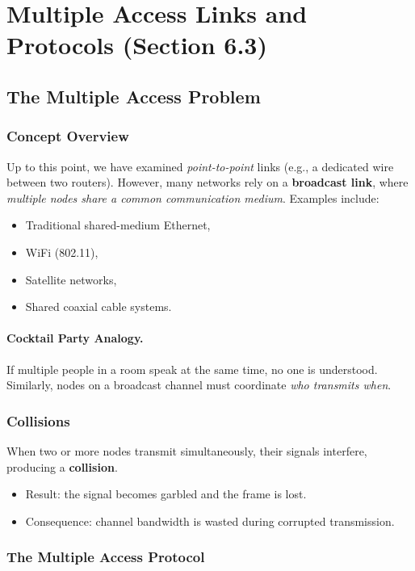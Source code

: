 \documentclass[12pt]{article}
\begin{document}
\section{Multiple Access Links and Protocols (Section 6.3)}

\subsection{The Multiple Access Problem}

\subsubsection{Concept Overview}

Up to this point, we have examined \emph{point-to-point} links (e.g., a dedicated wire between two routers).
However, many networks rely on a \textbf{broadcast link}, where \emph{multiple nodes share a common communication medium}. Examples include:
\begin{itemize}
    \item Traditional shared-medium Ethernet,
    \item WiFi (802.11),
    \item Satellite networks,
    \item Shared coaxial cable systems.
\end{itemize}

\paragraph{Cocktail Party Analogy.}
If multiple people in a room speak at the same time, no one is understood. Similarly, nodes on a broadcast channel must coordinate \emph{who transmits when}.

\subsubsection{Collisions}

When two or more nodes transmit simultaneously, their signals interfere, producing a \textbf{collision}.
\begin{itemize}
    \item Result: the signal becomes garbled and the frame is lost.
    \item Consequence: channel bandwidth is wasted during corrupted transmission.
\end{itemize}

\subsubsection{The Multiple Access Protocol}
\end{document}
